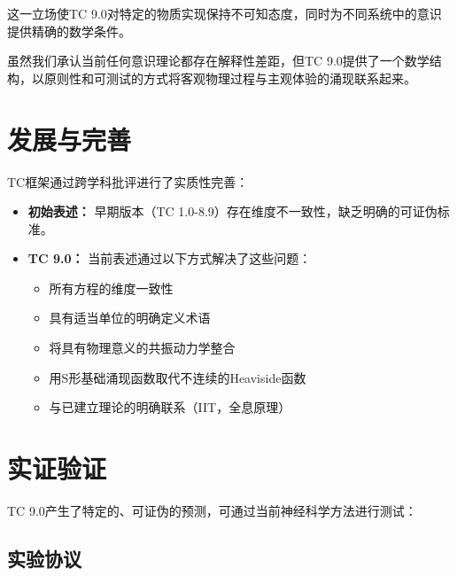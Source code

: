 \documentclass[12pt]{article}
\begin{document}
这一立场使TC 9.0对特定的物质实现保持不可知态度，同时为不同系统中的意识提供精确的数学条件。

虽然我们承认当前任何意识理论都存在解释性差距，但TC 9.0提供了一个数学结构，以原则性和可测试的方式将客观物理过程与主观体验的涌现联系起来。

\section{发展与完善}
TC框架通过跨学科批评进行了实质性完善：

\begin{itemize}
    \item \textbf{初始表述：} 早期版本（TC 1.0-8.9）存在维度不一致性，缺乏明确的可证伪标准。
    
    \item \textbf{TC 9.0：} 当前表述通过以下方式解决了这些问题：
    \begin{itemize}[label=--]
        \item 所有方程的维度一致性
        \item 具有适当单位的明确定义术语
        \item 将具有物理意义的共振动力学整合
        \item 用S形基础涌现函数取代不连续的Heaviside函数
        \item 与已建立理论的明确联系（IIT，全息原理）
    \end{itemize}
\end{itemize}

\section{实证验证}
TC 9.0产生了特定的、可证伪的预测，可通过当前神经科学方法进行测试：

\subsection{实验协议}
\end{document}
